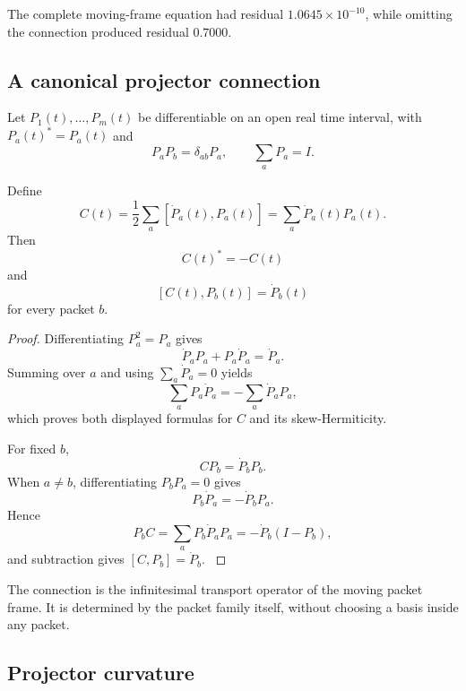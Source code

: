 \begin{certificate}\label{core:certificate:005}
The complete moving-frame equation had residual $1.0645\times10^{-10}$, while omitting the connection produced residual $0.7000$.
\end{certificate}

\subsection{A canonical projector connection}

Let $P_1(t),\ldots,P_m(t)$ be differentiable on an open real time interval, with $P_a(t)^*=P_a(t)$ and
\[
P_aP_b=\delta_{ab}P_a,
\qquad
\sum_aP_a=I.
\]

\begin{theorem}\label{core:theorem:011}\label{core:thm:canonical}
Define
\[
\boxed{
C(t)
=
\frac12\sum_a[\dot P_a(t),P_a(t)]
=
\sum_a\dot P_a(t)P_a(t).
}
\]
Then
\[
C(t)^*=-C(t)
\]
and
\[
\boxed{
[C(t),P_b(t)]=\dot P_b(t)
}
\]
for every packet $b$.
\end{theorem}

\begin{proof}\label{core:proof:012}
Differentiating $P_a^2=P_a$ gives
\[
\dot P_aP_a+P_a\dot P_a=\dot P_a.
\]
Summing over $a$ and using $\sum_a\dot P_a=0$ yields
\[
\sum_aP_a\dot P_a=-\sum_a\dot P_aP_a,
\]
which proves both displayed formulas for $C$ and its skew-Hermiticity.

For fixed $b$,
\[
CP_b=\dot P_bP_b.
\]
When $a\ne b$, differentiating $P_bP_a=0$ gives
\[
P_b\dot P_a=-\dot P_bP_a.
\]
Hence
\[
P_bC
=\sum_aP_b\dot P_aP_a
=-\dot P_b(I-P_b),
\]
and subtraction gives $[C,P_b]=\dot P_b$.
\label{core:proof:012:end}\end{proof}

The connection is the infinitesimal transport operator of the moving packet frame. It is determined by the packet family itself, without choosing a basis inside any packet.

\subsection{Projector curvature}

